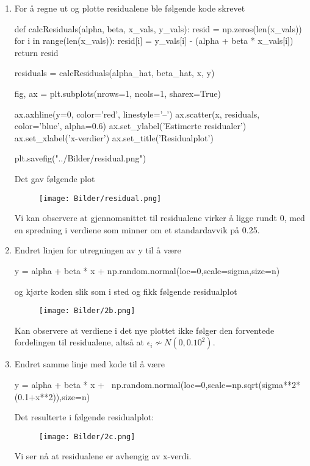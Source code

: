 \documentclass[a4paper,11pt,norsk]{article}
\begin{document}
\begin{enumerate}
    \item For å regne ut og plotte residualene ble følgende kode skrevet

    \begin{pythoncode}
    def calcResiduals(alpha, beta, x_vals, y_vals):
        resid = np.zeros(len(x_vals))
        for i in range(len(x_vals)):
            resid[i] = y_vals[i] - (alpha + beta * x_vals[i])
        return resid

    residuals = calcResiduals(alpha_hat, beta_hat, x, y)

    fig, ax = plt.subplots(nrows=1, ncols=1, sharex=True)

    ax.axhline(y=0, color='red', linestyle='--')
    ax.scatter(x, residuals, color='blue', alpha=0.6)
    ax.set_ylabel('Estimerte residualer')
    ax.set_xlabel('x-verdier')
    ax.set_title('Residualplot')

    plt.savefig("../Bilder/residual.png")
    \end{pythoncode}
        
    Det gav følgende plot
    \begin{figure}[H]
        \centering 
        \texttt{[image: Bilder/residual.png]}
    \end{figure}

    Vi kan observere at gjennomsnittet til residualene virker å ligge rundt 0, med en spredning i verdiene 
    som minner om et standardavvik på 0.25.

    \newpage
    \item Endret linjen for utregningen av y til å være 
        \begin{pythoncode}
y = alpha + beta * x + np.random.normal(loc=0,scale=sigma,size=n) 
        \end{pythoncode}

        og kjørte koden slik som i sted og fikk følgende residualplot
        \begin{figure}[H]
            \centering 
            \texttt{[image: Bilder/2b.png]}
        \end{figure}

        Kan observere at verdiene i det nye plottet ikke følger den forventede fordelingen til residualene, altså at 
        $\epsilon_i \nsim N(0, 0.10^2)$.

    \item Endret samme linje med kode til å være 
        \begin{pythoncode}
y = alpha + beta * x + \ 
    np.random.normal(loc=0,scale=np.sqrt(sigma**2*(0.1+x**2)),size=n)
        \end{pythoncode}

        Det resulterte i følgende residualplot:
        \begin{figure}[H]
            \centering 
            \texttt{[image: Bilder/2c.png]}
        \end{figure}

        Vi ser nå at residualene er avhengig av x-verdi.
\end{enumerate}
\end{document}
